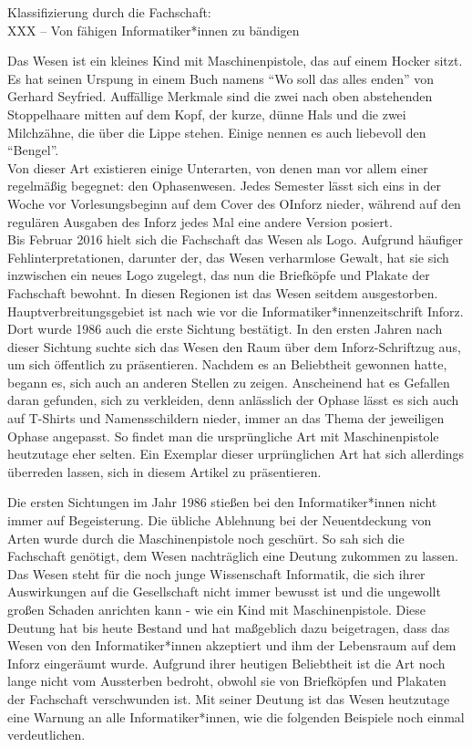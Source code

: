 {Klassifizierung durch die Fachschaft:\\
    XXX – Von fähigen Informatiker*innen zu bändigen}
{Das Wesen ist ein kleines Kind mit Maschinenpistole, das auf einem Hocker sitzt. Es hat seinen Urspung in einem Buch namens "`Wo soll das alles enden"' von Gerhard Seyfried. Auffällige Merkmale sind die zwei nach oben abstehenden Stoppelhaare mitten auf dem Kopf, der kurze, dünne Hals und die zwei Milchzähne, die über die Lippe stehen. Einige nennen es auch liebevoll den "`Bengel"'.\\

    Von dieser Art existieren einige Unterarten, von denen man vor allem einer regelmäßig begegnet: den Ophasenwesen. Jedes Semester lässt sich eins in der Woche vor Vorlesungsbeginn auf dem Cover des OInforz nieder, während auf den regulären Ausgaben des Inforz jedes Mal eine andere Version posiert.\\

    Bis Februar 2016 hielt sich die Fachschaft das Wesen als Logo. Aufgrund häufiger Fehlinterpretationen, darunter der, das Wesen verharmlose Gewalt, hat sie sich inzwischen ein neues Logo zugelegt, das nun die Briefköpfe und Plakate der Fachschaft bewohnt. In diesen Regionen ist das Wesen seitdem ausgestorben.\\

    Hauptverbreitungsgebiet ist nach wie vor die Informatiker*innenzeitschrift Inforz. Dort wurde 1986 auch die erste Sichtung bestätigt. In den ersten Jahren nach dieser Sichtung suchte sich das Wesen den Raum über dem Inforz-Schriftzug aus, um sich öffentlich zu präsentieren. Nachdem es an Beliebtheit gewonnen hatte, begann es, sich auch an anderen Stellen zu zeigen. Anscheinend hat es Gefallen daran gefunden, sich zu verkleiden, denn anlässlich der Ophase lässt es sich auch auf T-Shirts und Namensschildern nieder, immer an das Thema der jeweiligen Ophase angepasst. So findet man die ursprüngliche Art mit Maschinenpistole heutzutage eher selten. Ein Exemplar dieser urprünglichen Art hat sich allerdings überreden lassen, sich in diesem Artikel zu präsentieren.

    Die ersten Sichtungen im Jahr 1986 stießen bei den Informatiker*innen nicht immer auf Begeisterung. Die übliche Ablehnung bei der Neuentdeckung von Arten wurde durch die Maschinenpistole noch geschürt. So sah sich die Fachschaft genötigt, dem Wesen nachträglich eine Deutung zukommen zu lassen. Das Wesen steht für die noch junge Wissenschaft Informatik, die sich ihrer Auswirkungen auf die Gesellschaft nicht immer bewusst ist und die ungewollt großen Schaden anrichten kann - wie ein Kind mit Maschinenpistole. Diese Deutung hat bis heute Bestand und hat maßgeblich dazu beigetragen, dass das Wesen von den Informatiker*innen akzeptiert und ihm der Lebensraum auf dem Inforz eingeräumt wurde.
    Aufgrund ihrer heutigen Beliebtheit ist die Art noch lange nicht vom Aussterben bedroht, obwohl sie von Briefköpfen und Plakaten der Fachschaft verschwunden ist.
    Mit seiner Deutung ist das Wesen heutzutage eine Warnung an alle Informatiker*innen, wie die folgenden Beispiele noch einmal verdeutlichen.

}
